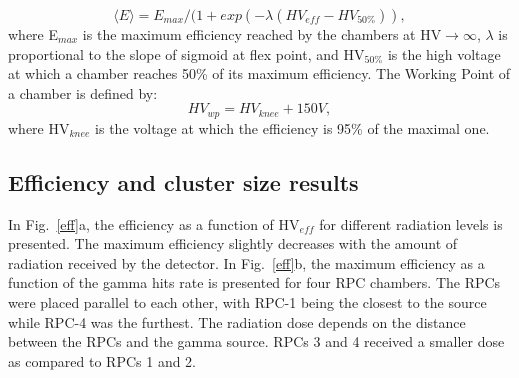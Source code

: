 \begin{equation}
{\langle E\rangle = E_{max} / (1 + exp (-\lambda (HV_{eff} - HV_{50\%})),}
\end{equation}
where E$_{max}$ is the maximum efficiency reached by the chambers at HV$\rightarrow \infty$, $\lambda$ is proportional to the slope of sigmoid at flex point, and HV$_{50\%}$ is the high voltage at which a chamber reaches 50\% of its maximum efficiency. The Working Point of a chamber is defined by:
\begin{equation}
 HV_{wp} = HV_{knee} + 150V,
\end{equation} 
where HV$_{knee}$ is the voltage at which the efficiency is 95\% of the maximal one.   

\subsection{Efficiency and cluster size results}
In Fig.~\ref{eff}a, the efficiency as a function of HV$_{eff}$ for different radiation levels is presented. The maximum efficiency slightly decreases with the amount of radiation received by the detector. In Fig.~\ref{eff}b, the maximum efficiency as a function of the gamma hits rate is presented for four RPC chambers. The RPCs were placed parallel to each other, with RPC-1 being the closest to the source while RPC-4 was the furthest. The radiation dose depends on the distance between the RPCs and the gamma source. RPCs 3 and 4 received a smaller dose as compared to RPCs 1 and 2. 
